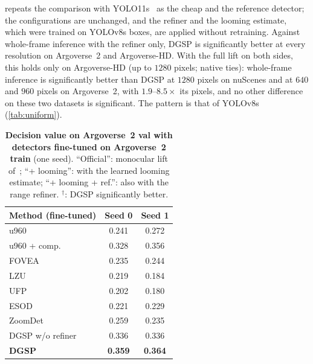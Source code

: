 \documentclass[10pt,letterpaper]{article}
\newcommand{\method}{DGSP\xspace}
\newcommand{\best}[1]{\textbf{#1}}
\newcommand{\oursrow}{\rowcolor{oursbg}}
\theoremstyle{remark}
\theoremstyle{plain}
\theoremstyle{definition}
\begin{document}
 repeats the comparison with YOLO11s~\cite{yolo11} as the cheap and the reference detector; the configurations are unchanged, and the refiner and the looming estimate, which were trained on YOLOv8s boxes, are applied without retraining.
Against whole-frame inference with the refiner only, \method is significantly better at every resolution on Argoverse~2 and Argoverse-HD.
With the full lift on both sides, this holds only on Argoverse-HD (up to $1280$ pixels; native ties): whole-frame inference is significantly better than \method at $1280$ pixels on nuScenes and at $640$ and $960$ pixels on Argoverse~2, with $1.9$--$8.5\times$ its pixels, and no other difference on these two datasets is significant.
The pattern is that of YOLOv8s (\cref{tab:uniform}).

\begin{table}[!htbp]
\centering
\begin{minipage}[t]{0.44\linewidth}
\centering
\caption{\textbf{Decision value on nuScenes held-out with detectors fine-tuned on the training split} (two training seeds). ``+ comp.'': with the refiner and the learned looming estimate of \method.}
\label{tab:ft}
\small
\setlength{\tabcolsep}{6pt}
\begin{tabular}{@{}lcc@{}}
\toprule
Method (fine-tuned) & Seed 0 & Seed 1 \\
\midrule
u960 & 0.241 & 0.272 \\
u960 + comp. & 0.328 & 0.356 \\
FOVEA~\cite{fovea} & 0.235 & 0.244 \\
LZU~\cite{lzu} & 0.219 & 0.184 \\
UFP~\cite{ufpmp} & 0.202 & 0.180 \\
ESOD~\cite{esod} & 0.221 & 0.229 \\
ZoomDet~\cite{zoomdet} & 0.259 & 0.235 \\
\midrule
\method w/o refiner & 0.336 & 0.336 \\
\oursrow \textbf{\method} & \best{0.359} & \best{0.364} \\
\bottomrule
\end{tabular}
\end{minipage}\hfill
\begin{minipage}[t]{0.53\linewidth}
\centering
\caption{\textbf{Decision value on Argoverse~2 val with detectors fine-tuned on Argoverse~2 train} (one seed). ``Official'': monocular lift of~\cite{deep}; ``+ looming'': with the learned looming estimate; ``+ looming + ref.'': also with the range refiner. $^{\dagger}$: \method significantly better.}

\end{minipage}
\end{table}
\end{document}
